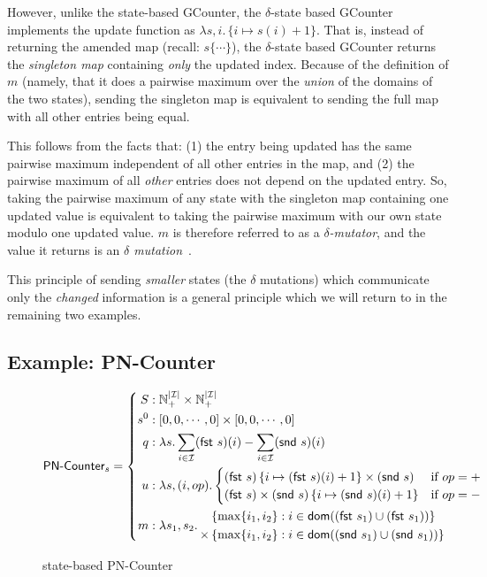 However, unlike the state-based GCounter, the $\delta$-state based GCounter
implements the update function as $\lambda s,i.\, \{ i \mapsto s(i) + 1\}$. That
is, instead of returning the amended map (recall: $s\{ \cdots \}$), the
$\delta$-state based GCounter returns the \emph{singleton map} containing
\emph{only} the updated index. Because of the definition of $m$ (namely, that it
does a pairwise maximum over the \emph{union} of the domains of the two states),
sending the singleton map is equivalent to sending the full map with all other
entries being equal.

This follows from the facts that: (1) the entry being updated has the same
pairwise maximum independent of all other entries in the map, and (2) the
pairwise maximum of all \emph{other} entries does not depend on the updated
entry. So, taking the pairwise maximum of any state with the singleton map
containing one updated value is equivalent to taking the pairwise maximum with
our own state modulo one updated value. $m$ is therefore referred to as a
\emph{$\delta$-mutator}, and the value it returns is an \emph{$\delta$
mutation}~\citep{almedia18}.

This principle of sending \emph{smaller} states (the $\delta$ mutations) which
communicate only the \emph{changed} information is a general principle which
we will return to in the remaining two examples.

\subsection{Example: PN-Counter}
\label{sec:example-pncounter}

\begin{figure}[H]
  \[
    \textsf{PN-Counter}_s = \left\{\begin{aligned}
      S &: \mathbb{N}_+^{|\mathcal{I}|} \times \mathbb{N}_+^{|\mathcal{I}|} \\
      s^0 &: \left[ 0, 0, \cdots, 0 \right] \times \left[ 0, 0, \cdots, 0 \right] \\
      q &: \lambda s. \sum_{i \in \mathcal{I}} (\textsf{fst}~s)(i) - \sum_{i \in
        \mathcal{I}} (\textsf{snd}~s)(i) \\
      u &: \lambda s,(i,op). \begin{cases}
             (\textsf{fst}~s)\left\{ i \mapsto (\textsf{fst}~s)(i) + 1 \right\} \times (\textsf{snd}~s) & \text{if $op=+$} \\
             (\textsf{fst}~s) \times (\textsf{snd}~s)\left\{ i \mapsto (\textsf{snd}~s)(i) + 1 \right\} & \text{if $op=-$} \\
           \end{cases} \\
      m &: \lambda s_1, s_2.\, \begin{aligned}
             &\left\{ \max\{ i_1, i_2 \} : i \in \mathsf{dom}((\textsf{fst}~s_1) \cup (\textsf{fst}~s_1)) \right\} \\
             \times &\left\{ \max\{ i_1, i_2 \} : i \in \mathsf{dom}((\textsf{snd}~s_1) \cup (\textsf{snd}~s_1)) \right\}
           \end{aligned}
    \end{aligned}\right.
  \]
  \caption{state-based \textsf{PN-Counter} \CRDT}
\end{figure}

